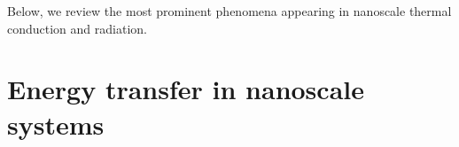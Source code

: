 

Below, we review the most prominent phenomena appearing in nanoscale thermal conduction and radiation. %




\section{Energy transfer in nanoscale systems}

